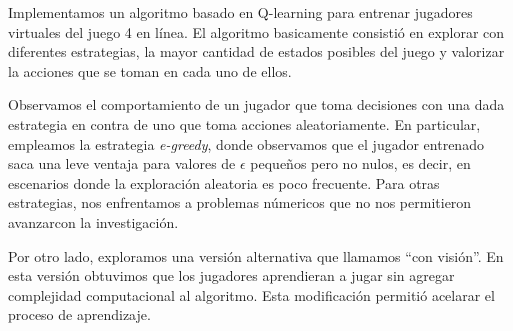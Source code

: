 \documentclass[11pt, spanish]{article}
\begin{document}
\par Implementamos un algoritmo basado en Q-learning para entrenar jugadores virtuales del juego 4 en línea. El algoritmo basicamente consistió en explorar con diferentes estrategias, la mayor cantidad de estados posibles del juego y valorizar la acciones que se toman en cada uno de ellos.
\par Observamos el comportamiento de un jugador que toma decisiones con una dada estrategia en contra de uno que toma acciones aleatoriamente. En particular, empleamos la estrategia \emph{e-greedy}, donde observamos que el jugador entrenado saca una leve ventaja para valores de $\epsilon$ pequeños pero no nulos, es decir, en escenarios donde la exploración aleatoria es poco frecuente. Para otras estrategias, nos enfrentamos a problemas númericos que no nos permitieron avanzarcon la investigación.
\par Por otro lado, exploramos una versión alternativa que llamamos ``con visión''. En esta versi\'on obtuvimos que los jugadores aprendieran a jugar sin agregar complejidad computacional al algoritmo. Esta modificaci\'on permiti\'o acelarar el proceso de aprendizaje. 
\end{document}
